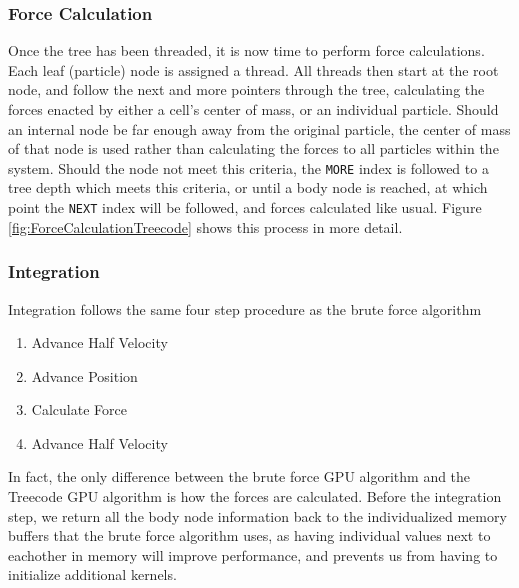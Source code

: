 \documentclass{thesis}
\begin{document}
\subsubsection{Force Calculation}
Once the tree has been threaded, it is now time to perform force calculations. Each leaf (particle) node is assigned a thread. All threads then start at the root node, and follow the next and more pointers through the tree, calculating the forces enacted by either a cell's center of mass, or an individual particle. Should an internal node be far enough away from the original particle, the center of mass of that node is used rather than calculating the forces to all particles within the system. Should the node not meet this criteria, the \verb|MORE| index is followed to a tree depth which meets this criteria, or until a body node is reached, at which point the \verb|NEXT| index will be followed, and forces calculated like usual. Figure \ref{fig:ForceCalculationTreecode} shows this process in more detail.
\subsubsection{Integration}
Integration follows the same four step procedure as the brute force algorithm
\begin{enumerate}[noitemsep]
    \item Advance Half Velocity
    \item Advance Position
    \item Calculate Force
    \item Advance Half Velocity
\end{enumerate}
In fact, the only difference between the brute force GPU algorithm and the Treecode GPU algorithm is how the forces are calculated. Before the integration step, we return all the body node information back to the individualized memory buffers that the brute force algorithm uses, as having individual values next to eachother in memory will improve performance, and prevents us from having to initialize additional kernels.
\end{document}
